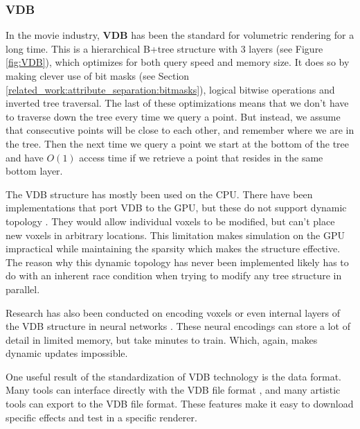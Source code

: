 \subsubsection{VDB} \label{related_work:voxel_data_structures:vdb}
In the movie industry, \textbf{VDB} \cite{museth2013vdb} has been the standard for volumetric rendering for a long time. This is a hierarchical B+tree structure with 3 layers (see Figure \ref{fig:VDB}), which optimizes for both query speed and memory size. It does so by making clever use of bit masks (see Section \ref{related_work:attribute_separation:bitmasks}), logical bitwise operations and inverted tree traversal. The last of these optimizations means that we don't have to traverse down the tree every time we query a point. But instead, we assume that consecutive points will be close to each other, and remember where we are in the tree. Then the next time we query a point we start at the bottom of the tree and have $O(1)$ access time if we retrieve a point that resides in the same bottom layer.

The VDB structure has mostly been used on the CPU. There have been implementations that port VDB to the GPU, but these do not support dynamic topology \cite{hoetzlein2016gvdb} \cite{museth2021nanovdb}. They would allow individual voxels to be modified, but can't place new voxels in arbitrary locations. This limitation makes simulation on the GPU impractical while maintaining the sparsity which makes the structure effective. The reason why this dynamic topology has never been implemented likely has to do with an inherent race condition when trying to modify any tree structure in parallel.

Research has also been conducted on encoding voxels or even internal layers of the VDB structure in neural networks \cite{kim2022neuralvdb}. These neural encodings can store a lot of detail in limited memory, but take minutes to train. Which, again, makes dynamic updates impossible.

One useful result of the standardization of VDB technology is the data format. Many tools can interface directly with the VDB file format \cite{VDBADeepDive}, and many artistic tools can export to the VDB file format. These features make it easy to download specific effects and test in a specific renderer.


